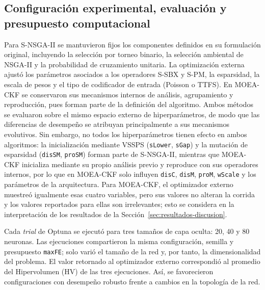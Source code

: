 \subsection{Configuración experimental, evaluación y presupuesto computacional}\label{subsec:configuracion_evaluacion_presupuesto}

Para S-NSGA-II se mantuvieron fijos los componentes definidos en su formulación original, incluyendo la selección por torneo binario, la selección ambiental de NSGA-II y la probabilidad de cruzamiento unitaria. La optimización externa ajustó los parámetros asociados a los operadores S-SBX y S-PM, la esparsidad, la escala de pesos y el tipo de codificador de entrada (Poisson o TTFS). En MOEA-CKF se conservaron sus mecanismos internos de análisis, agrupamiento y reproducción, pues forman parte de la definición del algoritmo. Ambos métodos se evaluaron sobre el mismo espacio externo de hiperparámetros, de modo que las diferencias de desempeño se atribuyan principalmente a sus mecanismos evolutivos. Sin embargo, no todos los hiperparámetros tienen efecto en ambos algoritmos: la inicialización mediante VSSPS (\texttt{sLower}, \texttt{sGap}) y la mutación de esparsidad (\texttt{disSM}, \texttt{proSM}) forman parte de S-NSGA-II, mientras que MOEA-CKF inicializa mediante su propio análisis previo y reproduce con sus operadores internos, por lo que en MOEA-CKF solo influyen \texttt{disC}, \texttt{disM}, \texttt{proM}, \texttt{wScale} y los parámetros de la arquitectura. Para MOEA-CKF, el optimizador externo muestreó igualmente esas cuatro variables, pero sus valores no alteran la corrida y los valores reportados para ellas son irrelevantes; esto se considera en la interpretación de los resultados de la Sección~\ref{sec:resultados-discusion}.

Cada \textit{trial} de Optuna se ejecutó para tres tamaños de capa oculta: 20, 40 y 80 neuronas. Las ejecuciones compartieron la misma configuración, semilla y presupuesto \texttt{maxFE}; solo varió el tamaño de la red y, por tanto, la dimensionalidad del problema. El valor retornado al optimizador externo correspondió al promedio del Hipervolumen (HV) de las tres ejecuciones. Así, se favorecieron configuraciones con desempeño robusto frente a cambios en la topología de la red.

